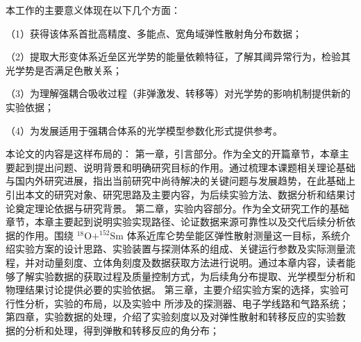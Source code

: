 本工作的主要意义体现在以下几个方面：

（1）获得该体系首批高精度、多能点、宽角域弹性散射角分布数据；

（2）提取大形变体系近垒区光学势的能量依赖特征，了解其阈异常行为，检验其光学势是否满足色散关系；

（3）为理解强耦合吸收过程（非弹激发、转移等）对光学势的影响机制提供新的实验依据；

（4）为发展适用于强耦合体系的光学模型参数化形式提供参考。

本论文的内容是这样布局的：
第一章，引言部分。作为全文的开篇章节，本章主要起到提出问题、说明背景和明确研究目标的作用。通过梳理本课题相关理论基础与国内外研究进展，指出当前研究中尚待解决的关键问题与发展趋势，在此基础上引出本文的研究对象、研究思路及主要内容，为后续实验方法、数据分析和结果讨论奠定理论依据与研究背景。
第二章，实验内容部分。作为全文研究工作的基础章节，本章主要起到说明实验实现路径、论证数据来源可靠性以及交代后续分析依据的作用。围绕 $^{18}\mathrm O+^{152}\mathrm{Sm}$ 体系近库仑势垒能区弹性散射测量这一目标，系统介绍实验方案的设计思路、实验装置与探测体系的组成、关键运行参数及实际测量流程，并对动量刻度、立体角刻度及数据获取方法进行说明。通过本章内容，读者能够了解实验数据的获取过程及质量控制方式，为后续角分布提取、光学模型分析和物理结果讨论提供必要的实验依据。
第三章，主要介绍实验方案的选择，实验可行性分析，实验的布局，以及实验中
所涉及的探测器、电子学线路和气路系统；
第四章，实验数据的处理，介绍了实验刻度以及对弹性散射和转移反应的实验数
据的分析和处理，得到弹散和转移反应的角分布；

